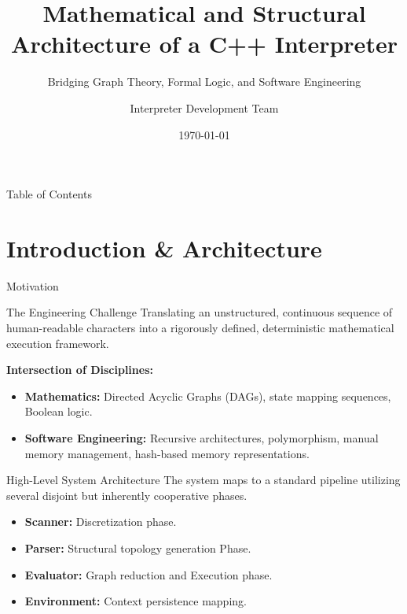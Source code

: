 \documentclass[aspectratio=169]{beamer}
\title[Interpreter Architecture]{Mathematical and Structural Architecture of a C++ Interpreter}
\subtitle{Bridging Graph Theory, Formal Logic, and Software Engineering}
\author{Interpreter Development Team}
\date{\today}
\begin{document}

\begin{frame}
    \titlepage
\end{frame}

\begin{frame}{Table of Contents}
    \tableofcontents
\end{frame}

\section{Introduction \& Architecture}

\begin{frame}{Motivation}
    \begin{block}{The Engineering Challenge}
        Translating an unstructured, continuous sequence of human-readable characters into a rigorously defined, deterministic mathematical execution framework. 
    \end{block}
    \vspace{0.5cm}
    \textbf{Intersection of Disciplines:}
    \begin{itemize}
        \item \textbf{Mathematics:} Directed Acyclic Graphs (DAGs), state mapping sequences, Boolean logic.
        \item \textbf{Software Engineering:} Recursive architectures, polymorphism, manual memory management, hash-based memory representations.
    \end{itemize}
\end{frame}

\begin{frame}{High-Level System Architecture}
    The system maps to a standard pipeline utilizing several disjoint but inherently cooperative phases.
    \begin{itemize}
        \item \textbf{Scanner:} Discretization phase.
        \item \textbf{Parser:} Structural topology generation Phase.
        \item \textbf{Evaluator:} Graph reduction and Execution phase.
        \item \textbf{Environment:} Context persistence mapping.
    \end{itemize}
\end{frame}
\end{document}
